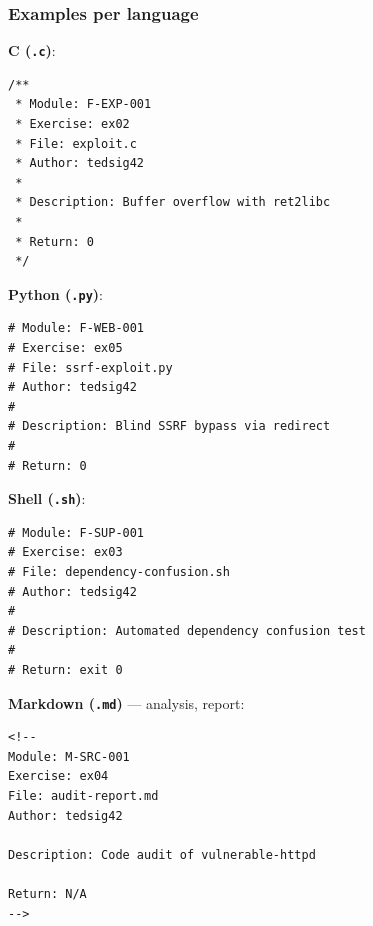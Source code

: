 \subsubsection*{Examples per language}

\textbf{C (\texttt{.c})}:
\begin{verbatim}
/**
 * Module: F-EXP-001
 * Exercise: ex02
 * File: exploit.c
 * Author: tedsig42
 *
 * Description: Buffer overflow with ret2libc
 *
 * Return: 0
 */
\end{verbatim}

\textbf{Python (\texttt{.py})}:
\begin{verbatim}
# Module: F-WEB-001
# Exercise: ex05
# File: ssrf-exploit.py
# Author: tedsig42
#
# Description: Blind SSRF bypass via redirect
#
# Return: 0
\end{verbatim}

\textbf{Shell (\texttt{.sh})}:
\begin{verbatim}
# Module: F-SUP-001
# Exercise: ex03
# File: dependency-confusion.sh
# Author: tedsig42
#
# Description: Automated dependency confusion test
#
# Return: exit 0
\end{verbatim}

\textbf{Markdown (\texttt{.md})} --- analysis, report:
\begin{Verbatim}[fontsize=\normalsize]
<!--
Module: M-SRC-001
Exercise: ex04
File: audit-report.md
Author: tedsig42

Description: Code audit of vulnerable-httpd

Return: N/A
-->
\end{Verbatim}
